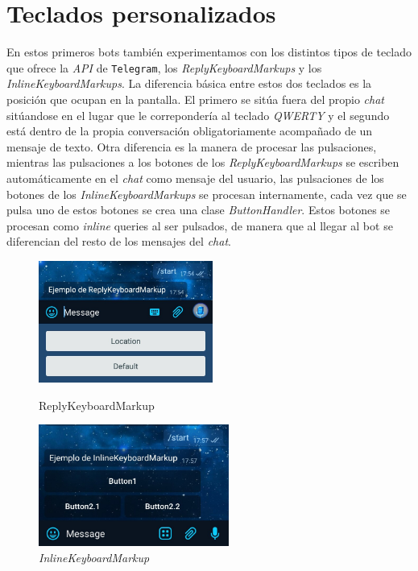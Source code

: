 \documentclass[oneside]{memoir}
\begin{document}
\section{Teclados personalizados}
En estos primeros bots también experimentamos con los distintos tipos de teclado que ofrece la \textit{API} de \texttt{Telegram}, los \textit{ReplyKeyboardMarkups} y los \textit{InlineKeyboardMarkups}. La diferencia básica entre estos dos teclados es la posición que ocupan en la pantalla. El primero se sitúa fuera del propio \textit{chat} sitúandose en el lugar que le correpondería al teclado \textit{QWERTY} y el segundo está dentro de la propia conversación obligatoriamente acompañado de un mensaje de texto. Otra diferencia es la manera de procesar las pulsaciones, mientras las pulsaciones a los botones de los \textit{ReplyKeyboardMarkups} se escriben automáticamente en el \textit{chat} como mensaje del usuario, las pulsaciones de los botones de los \textit{InlineKeyboardMarkups} se procesan internamente, cada vez que se pulsa uno de estos botones se crea una clase \textit{ButtonHandler}. Estos botones se procesan como \textit{inline} queries al ser pulsados, de manera que al llegar al bot se diferencian del resto de los mensajes del \textit{chat}.

\begin{figure}[h!]
\centering
\begin{minipage}{6cm}
  \centering
  \includegraphics[height=40mm]{replyKB.jpg}
  \caption{ReplyKeyboardMarkup}
  \label{fig:ReplyKeyboardMarkup}
\end{minipage}%
\begin{minipage}{6cm}
  \centering
  \includegraphics[height=40mm]{inlineKB.jpg}
  \caption{\textit{InlineKeyboardMarkup}}
  \label{fig:InlineKeyboardMarkups}
\end{minipage}
\end{figure}
\end{document}
